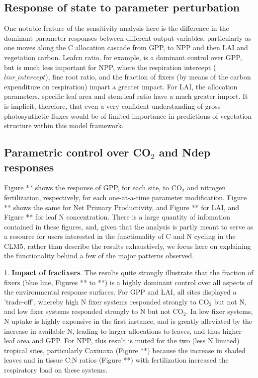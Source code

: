 \documentclass[draft,linenumbers]{agujournal}
\begin{document}
\subsection{Response of state to parameter perturbation}
One notable feature of the sensitivity analysis here is the difference in the dominant parameter responses between different output variables, particularly as one moves along the C allocation cascade from GPP, to NPP and then LAI and vegetation carbon. Leafcn ratio, for example, is a dominant control over GPP, but is much less important for NPP, where the respiration intercept ($lmr\_{intercept}$), fine root ratio, and the fraction of fixers (by means of the carbon expenditure on respiration) impart a greater impact. For LAI, the allocation parameters, specific leaf  area and stem:leaf ratio have a much greater import. It is implicit, therefore, that even a very confident understanding of gross photosynthetic fluxes would be of limited importance in predictions of vegetation structure within this model framework. 


\subsection{Parametric control over CO$_{2}$ and Ndep responses}


Figure ** shows the response of GPP, for each site, to CO$_{2}$ and nitrogen fertilization, respectively, for each one-at-a-time parameter modification. Figure ** shows the same for Net Primary Productivity, and Figure ** for LAI, and Figure ** for leaf N concentration. There is a large quantity of infomation contained in these figures, and, given that the analysis is partly meant to serve as a resource for users interested in the functionality of C and N cycling in the CLM5,  rather than describe the results exhaustively, we focus here on explaining the functionality behind a few of the major patterns observed.

1. \textbf{Impact of fracfixers}. The results quite strongly illustrate that the fraction of fixers (blue line, Figures ** to **) is a highly dominant control over all aspects of the environmental response surfaces.  For GPP and LAI, all sites displayed a 'trade-off', whereby high N fixer systems responded strongly to CO$_{2}$ but not N, and low fixer systems responded strongly to N but not CO$_{2}$. In low fixer systems, N uptake is highly expensive in the first instance, and is greatly alleviated by the increase in available N, leading to larger allocations to leaves, and thus higher leaf area and GPP. For NPP, this result is muted for the two (less N limited) tropical sites, particularly Caxiuaxa (Figure **)  because the increase in shaded leaves and in tissue C:N ratios (Figure **)  with fertilization increased the respiratory load on these systems. 
\end{document}
